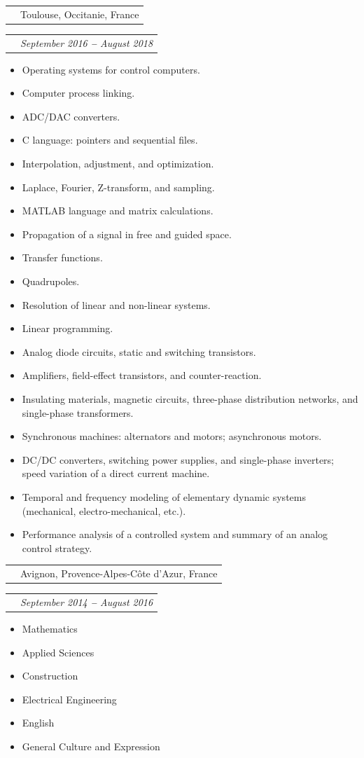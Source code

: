 \documentclass[letterpaper,11pt]{article}
\makeatletter
\def\vspaceAfterBullets{3.5pt} %
\def\bulletIndent{20pt} %
\newcommand{\bulletItem}[1]{
  \item\small{
    {#1}
  }
}
\newcommand{\companyNameAndLocationHeading}[2]{
  \item
    \begin{tabular*}{1.0\textwidth}[b]{l@{\extracolsep{\fill}}r}
      \textbf{#1} & #2
    \end{tabular*}
}
\newcommand{\titleAndDateHeading}[2]{
    \item
    \begin{tabular*}{1.0\textwidth}[b]{l@{\extracolsep{\fill}}r}
      {\bfseries\itshape\small #1} & \itshape\small #2
    \end{tabular*}
}
\newcommand{\outerBulletListStart}{\begin{itemize}[leftmargin=\bulletIndent]}
\newcommand{\outerBulletListEnd}{\end{itemize}\vspace{\vspaceAfterBullets}}
\newcommand{\bref}[2]{\href{#1}{\color{blue}{#2}}}
\makeatother
\begin{document}
\companyNameAndLocationHeading
{\bref{https://www.univ-tlse3.fr/decouvrir-nos-diplomes/licence-parcours-eea-fondamental-eea-f}{Toulouse 3 University \enquote{Paul Sabatier}}}{Toulouse, Occitanie, France}
\titleAndDateHeading
{\bref{https://github.com/slalomeset/diplomas/blob/main/bachelor.pdf}{Bachelor in \enquote{Electronics, Electrical Engineering and Automation.}}}{September 2016 \textbf{--} August 2018}
\outerBulletListStart
\bulletItem{Operating systems for control computers.}
\bulletItem{Computer process linking.}
\bulletItem{ADC/DAC converters.}
\bulletItem{C language: pointers and sequential files.}
\bulletItem{Interpolation, adjustment, and optimization.}
\bulletItem{Laplace, Fourier, Z-transform, and sampling.}
\bulletItem{MATLAB language and matrix calculations.}
\bulletItem{Propagation of a signal in free and guided space.}
\bulletItem{Transfer functions.}
\bulletItem{Quadrupoles.}
\bulletItem{Resolution of linear and non-linear systems.}
\bulletItem{Linear programming.}
\bulletItem{Analog diode circuits, static and switching transistors.}
\bulletItem{Amplifiers, field-effect transistors, and counter-reaction.}
\bulletItem{Insulating materials, magnetic circuits, three-phase distribution networks, and single-phase transformers.}
\bulletItem{Synchronous machines: alternators and motors; asynchronous motors.}
\bulletItem{DC/DC converters, switching power supplies, and single-phase inverters; speed variation of a direct current machine.}
\bulletItem{Temporal and frequency modeling of elementary dynamic systems (mechanical, electro-mechanical, etc.).}
\bulletItem{Performance analysis of a controlled system and summary of an analog control strategy.}
\outerBulletListEnd
\vspace{1em}

\companyNameAndLocationHeading
{\bref{https://www.cned.fr/}{CNED \enquote{Centre National d'Enseignement à Distance}}}{Avignon, Provence-Alpes-Côte d’Azur, France}
\titleAndDateHeading
{\bref{https://github.com/slalomeset/diplomas/blob/main/bts.pdf}{BTEC HND in \enquote{Electrical Engineering and Electronics }}}{September 2014 \textbf{--} August 2016}
\outerBulletListStart
\bulletItem{Mathematics}
\bulletItem{Applied Sciences}
\bulletItem{Construction}
\bulletItem{Electrical Engineering}
\bulletItem{English}
\bulletItem{General Culture and Expression}
\outerBulletListEnd
\vspace{1em} %
\end{document}
